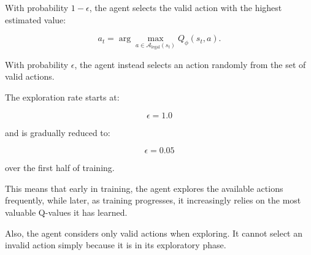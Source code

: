 With probability \(1 - \epsilon\), the agent selects the valid action
with the highest estimated value:

\[a_{t} = \arg{\max_{a \in \mathcal{A}_{\text{legal}}\left( s_{t} \right)}{Q_{\phi}\left( s_{t},a \right)}}.\]

With probability \(\epsilon\), the agent instead selects an action
randomly from the set of valid actions.

The exploration rate starts at:

\[\epsilon = 1.0\]

and is gradually reduced to:

\[\epsilon = 0.05\]

over the first half of training.

This means that early in training, the agent explores the available
actions frequently, while later, as training progresses, it increasingly
relies on the most valuable Q-values it has learned.

Also, the agent considers only valid actions when exploring. It cannot
select an invalid action simply because it is in its exploratory phase.
